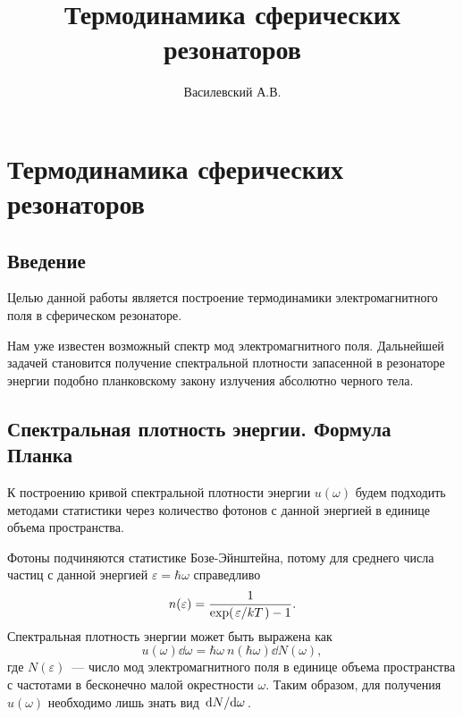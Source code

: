 \documentclass[12pt,a4paper]{article}
\title{Термодинамика сферических резонаторов}
\author{Василевский А.В.}
\begin{document}
    \maketitle
    \tableofcontents

    \section{Термодинамика сферических резонаторов}


    \subsection*{Введение}

        Целью данной работы является построение термодинамики электромагнитного поля в сферическом резонаторе.

        Нам уже известен возможный спектр мод электромагнитного поля. Дальнейшей задачей становится получение спектральной плотности запасенной в резонаторе энергии подобно планковскому закону излучения абсолютно черного тела.


    \subsection{Спектральная плотность энергии. Формула Планка}

        К построению кривой спектральной плотности энергии $u(\omega)$ будем подходить методами статистики через количество фотонов с данной энергией в единице объема пространства.

        Фотоны подчиняются статистике Бозе-Эйнштейна, потому для среднего числа частиц с данной энергией $\varepsilon = \hbar \omega$ справедливо
        \begin{equation}
            n(\varepsilon) = \frac{1}{\exp(\flatfrac{\varepsilon}{kT}) - 1} .
        \end{equation}
        Спектральная плотность энергии может быть выражена как
        \begin{equation}\label{eq:psd}
            u(\omega) \dd{\omega} = \hbar\omega\ n(\hbar\omega) \dd{N(\omega)} ,
        \end{equation}
        где $N(\varepsilon)$~--- число мод электромагнитного поля в единице объема пространства с частотами в бесконечно малой окрестности $\omega$. Таким образом, для получения $u(\omega)$ необходимо лишь знать вид $\dv*{N}{\omega}$.
\end{document}
